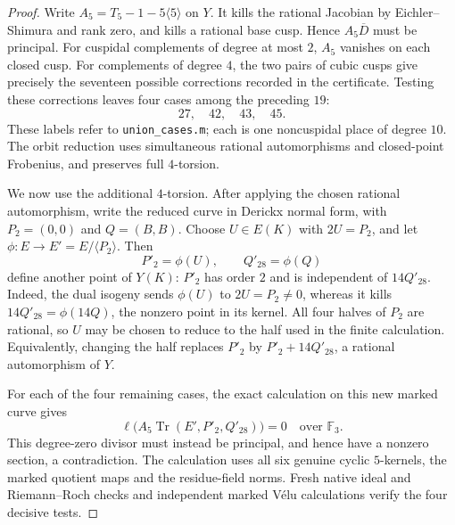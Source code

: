 \begin{proof}
Write $A_5=T_5-1-5\langle5\rangle$ on $Y$.
It kills the rational Jacobian by Eichler--Shimura and rank
zero, and kills a rational base cusp. Hence
$A_5\overline D$ must be principal.
For cuspidal complements of degree at most $2$, $A_5$ vanishes
on each closed cusp. For complements of degree $4$, the two
pairs of cubic cusps give precisely the seventeen possible
corrections recorded in the certificate. Testing these
corrections leaves four cases among the preceding $19$:
\[
                         27,\quad42,\quad43,\quad45.
\]
These labels refer to \texttt{union\_cases.m}; each is one
noncuspidal place of degree $10$. The orbit reduction uses
simultaneous rational automorphisms and closed-point
Frobenius, and preserves full $4$-torsion.

We now use the additional $4$-torsion. After applying the
chosen rational automorphism, write the reduced curve in
Derickx normal form, with $P_2=(0,0)$ and $Q=(B,B)$.
Choose $U\in E(K)$ with $2U=P_2$, and let
$\phi:E\to E'=E/\langle P_2\rangle$.
Then
\[
                   P'_2=\phi(U),\qquad Q'_{28}=\phi(Q)
\]
define another point of $Y(K)$: $P'_2$ has order $2$ and is
independent of $14Q'_{28}$. Indeed, the dual isogeny sends $\phi(U)$ to $2U=P_2\ne0$,
whereas it kills $14Q'_{28}=\phi(14Q)$, the nonzero point in
its kernel. All four halves of $P_2$ are rational, so $U$ may be
chosen to reduce to the half used in the finite calculation.
Equivalently, changing the half replaces $P'_2$ by
$P'_2+14Q'_{28}$, a rational automorphism of $Y$.

For each of the four remaining cases, the exact calculation
on this new marked curve gives
\[
 \ell\bigl(A_5\operatorname{Tr}(E',P'_2,Q'_{28})\bigr)=0
                       \quad\text{over }\mathbb F_3.
\]
This degree-zero divisor must instead be principal, and hence
have a nonzero section, a contradiction. The calculation uses
all six genuine cyclic $5$-kernels, the marked quotient maps
and the residue-field norms. Fresh native ideal and
Riemann--Roch checks and independent marked V\'elu calculations
verify the four decisive tests.
\end{proof}
